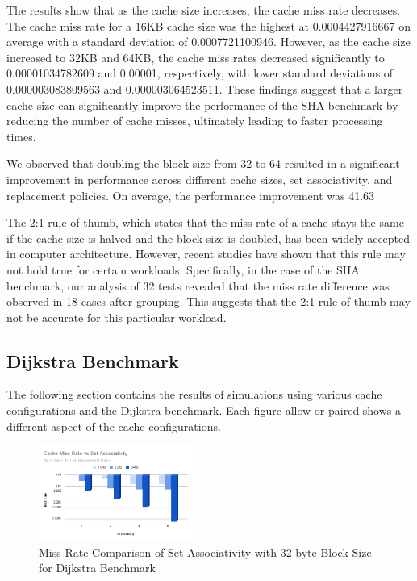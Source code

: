\documentclass[conference]{IEEEtran}
\begin{document}
The results show that as the cache size increases, the cache miss rate decreases. The cache miss rate for a 16KB cache size was the highest at 0.0004427916667 on average with a standard deviation of 0.0007721100946. However, as the cache size increased to 32KB and 64KB, the cache miss rates decreased significantly to 0.00001034782609 and 0.00001, respectively, with lower standard deviations of 0.000003083809563 and 0.000003064523511. These findings suggest that a larger cache size can significantly improve the performance of the SHA benchmark by reducing the number of cache misses, ultimately leading to faster processing times.

We observed that doubling the block size from 32 to 64 resulted in a significant improvement in performance across different cache sizes, set associativity, and replacement policies. On average, the performance improvement was 41.63%

The 2:1 rule of thumb, which states that the miss rate of a cache stays the same if the cache size is halved and the block size is doubled, has been widely accepted in computer architecture. However, recent studies have shown that this rule may not hold true for certain workloads. Specifically, in the case of the SHA benchmark, our analysis of 32 tests revealed that the miss rate difference was observed in 18 cases after grouping. This suggests that the 2:1 rule of thumb may not be accurate for this particular workload.

\subsection{Dijkstra Benchmark}

The following section contains the results of simulations using various cache configurations and the Dijkstra benchmark. Each figure allow or paired shows a different aspect of the cache configurations.

\begin{figure}[H]
  \centering
  \includegraphics[width=0.45\textwidth]{dijkstraFigures/CacheMissRateVsSetAssociativity32.png}
  \caption{Miss Rate Comparison of Set Associativity with 32 byte Block Size for Dijkstra Benchmark}
  \label{fig:MissRateVsSetAssoc32}
\end{figure}
\end{document}
